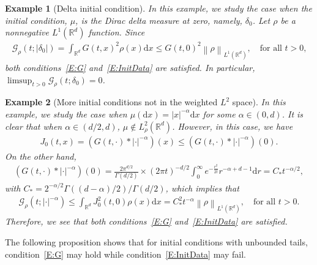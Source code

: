 \documentclass[sn-mathphys]{sn-jnl}%
\newcommand{\BR}{\mathbb{R}}
\newcommand{\Norm}[1]{\left\| #1 \right\|}
\newcommand{\ud}{\ensuremath{\mathrm{d}}}
\numberwithin{equation}{section}
\theoremstyle{thmstyleone}%
\theoremstyle{thmstyletwo}%
\newtheorem{example}{Example}[section]%
\theoremstyle{thmstylethree}%
\begin{document}
\begin{example}[Delta initial condition]\label{Ex:delta}
  In this example, we study the case when the initial condition, $\mu$, is the Dirac delta measure
  at zero, namely, $\delta_0$. Let $\rho$ be a nonnegative $L^1 (\BR^d)$ function. Since
  \begin{align*}
    \mathcal{G}_\rho(t;\lvert \delta_0 \rvert)
    = \int_{\BR^d} G(t,x)^2 \rho(x) \ud x
    \le G(t,0)^2 \Norm{\rho}_{L^1 (\BR^d)},
    \quad \text{for all $t>0$,}
  \end{align*}
  both conditions~\eqref{E:G} and~\eqref{E:InitData} are satisfied. In particular, $\limsup_{t>0}
  \mathcal{G}_\rho(t;\delta_0) = 0$.
\end{example}


\begin{example}[More initial conditions not in the weighted $L^2$ space]\label{Ex:Riesz}
  In this example, we study the case when $\mu(\ud x) = \lvert x \rvert^{-\alpha}\ud x$ for some $\alpha\in
  (0,d)$. It is clear that when $\alpha\in (d/2,d)$, $\mu\not\in L_\rho^2 (\BR^d)$. However, in this
  case, we have
  \begin{align*}
    J_0(t,x) = \left(G(t,\cdot)* \lvert \cdot \rvert^{-\alpha}\right)(x)
    \le \left(G(t,\cdot)* \lvert \cdot \rvert^{-\alpha}\right)(0).
  \end{align*}
  On the other hand,
  \begin{align*}
    \left(G(t,\cdot)* \lvert \cdot \rvert^{-\alpha}\right)(0)
    = \frac{2\pi^{d/2}}{\Gamma(d/2)}\times (2\pi t)^{-d/2} \int_0^\infty e^{-\frac{r^2}{2t}} r^{-\alpha + d-1} \ud r = C_* t^{-\alpha/2},
  \end{align*}
  with $C_* = 2^{-\alpha/2}\Gamma\left((d-\alpha)/2\right)/\Gamma(d/2)$, which implies that
  \begin{align*}
    \mathcal{G}_\rho\left(t;\lvert \cdot \rvert^{-\alpha}\right)
    \le \int_{\BR^d} J_0^2 (t,0) \rho(x) \ud x
    = C_*^2 t^{-\alpha} \Norm{\rho}_{L^1 (\BR^d)},
    \quad \text{for all $t>0$.}
  \end{align*}
  Therefore, we see that both conditions~\eqref{E:G} and~\eqref{E:InitData} are satisfied.
\end{example}

The following proposition shows that for initial conditions with unbounded tails,
condition~\eqref{E:G} may hold while condition~\eqref{E:InitData} may fail.
\end{document}
